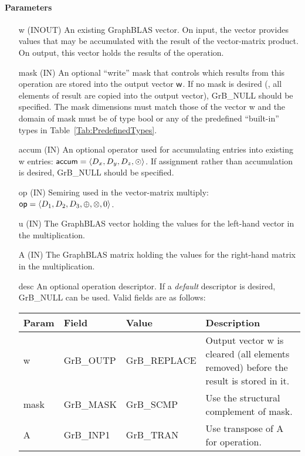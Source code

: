 \paragraph{Parameters}

\begin{itemize}[leftmargin=1.1in]
    \item[{\sf w}]    ({\sf INOUT}) An existing GraphBLAS vector.  On input, the
    vector provides values that may be accumulated with the result of the
    vector-matrix product.  On output, this vector holds the results of the
    operation.

    \item[{\sf mask}] ({\sf IN}) An optional ``write'' mask that controls which
    results from this operation are stored into the output vector
    ${\sf w}$.  If no mask is desired (\ie, all elements
    of result are copied into the output vector), {\sf GrB\_NULL}
    should be specified. The mask dimensions must match those of the
    vector {\sf w} and the domain of {\sf mask} must be
    of type {\sf bool} or any of the predefined ``built-in'' types in
    Table~\ref{Tab:PredefinedTypes}.

    \item[{\sf accum}] ({\sf IN}) An optional operator used for accumulating
    entries into existing {\sf w} entries: ${\sf accum} = \langle D_x,
    D_y, D_z,\odot \rangle$. If assignment rather than accumulation is
    desired, {\sf GrB\_NULL} should be specified.

    \item[{\sf op}]   ({\sf IN}) Semiring used in the vector-matrix
    multiply: ${\sf op}=\langle D_1,D_2,D_3,\oplus,\otimes,0 \rangle$.
    
    \item[{\sf u}]    ({\sf IN}) The GraphBLAS vector holding the values for
    the left-hand vector in the multiplication.
    
    \item[{\sf A}]    ({\sf IN}) The GraphBLAS matrix holding the values
    for the right-hand matrix in the multiplication.

    \item[{\sf desc}]  An optional operation descriptor.  If
    a \emph{default} descriptor is desired, {\sf GrB\_NULL} can be
    used.  Valid fields are as follows: \\
    
    \begin{tabular}{lllp{2.5in}}
    Param & Field  & Value & Description \\
    \hline
    {\sf w}    & {\sf GrB\_OUTP} & {\sf GrB\_REPLACE} & Output vector {\sf w} is cleared (all elements removed) before the result is stored in it.\\
    {\sf mask} & {\sf GrB\_MASK} & {\sf GrB\_SCMP}   & Use the structural complement of {\sf mask}. \\
    {\sf A}    & {\sf GrB\_INP1} & {\sf GrB\_TRAN}   & Use transpose of {\sf A} for operation. \\
    \end{tabular}
\end{itemize}

